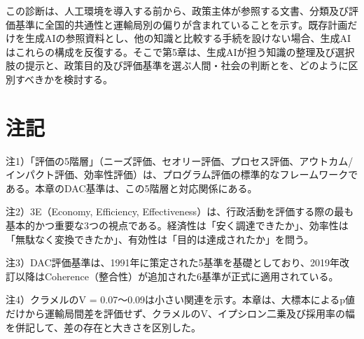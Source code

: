 この診断は、人工環境を導入する前から、政策主体が参照する文書、分類及び評価基準に全国的共通性と運輸局別の偏りが含まれていることを示す。既存計画だけを生成AIの参照資料とし、他の知識と比較する手続を設けない場合、生成AIはこれらの構成を反復する。そこで第5章は、生成AIが担う知識の整理及び選択肢の提示と、政策目的及び評価基準を選ぶ人間・社会の判断とを、どのように区別すべきかを検討する。

\section*{注記}

注1）「評価の5階層」（ニーズ評価、セオリー評価、プロセス評価、アウトカム/インパクト評価、効率性評価）は、プログラム評価の標準的なフレームワークである。本章のDAC基準は、この5階層と対応関係にある。

注2）3E（Economy, Efficiency, Effectiveness）は、行政活動を評価する際の最も基本的かつ重要な3つの視点である。経済性は「安く調達できたか」、効率性は「無駄なく変換できたか」、有効性は「目的は達成されたか」を問う。

注3）DAC評価基準は、1991年に策定された5基準を基礎としており、2019年改訂以降はCoherence（整合性）が追加された6基準が正式に適用されている。

注4）クラメルのV = 0.07〜0.09は小さい関連を示す。本章は、大標本によるp値だけから運輸局間差を評価せず、クラメルのV、イプシロン二乗及び採用率の幅を併記して、差の存在と大きさを区別した。


\nocite{iwaki2016,kokudo46,takeuchi2019,unsho1963,publictransport2002,minoru2020,duflo2019,rossi2004,yuasa2021,mori2017,oecd2021,mlit2023,mlit2020,mlit2012,mlit2005,soumu2025,nishito2020,nojio2010,kato2020,rinso1971,yorii2021}
\printbibliography[heading=subbibliography,title={章末参考文献}]
